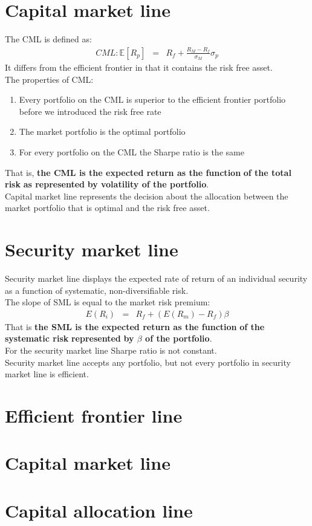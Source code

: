 \section{Capital market line}
The CML is defined as:
\begin{eqnarray}
	CML: \mathbb{E}[R_{p}] &=& R_{f} + \frac{R_{M} - R_{f}}{\sigma_{M}}\sigma_{p}
\end{eqnarray}
It differs from the efficient frontier in that it contains the risk free asset.\\
The properties of CML:
\begin{enumerate}
	\item Every portfolio on the CML is superior to the efficient frontier portfolio before we introduced the risk free rate
	\item The market portfolio is the optimal portfolio
	\item For every portfolio on the CML the Sharpe ratio is the same
\end{enumerate}
That is, \textbf{\color{blue}the CML is the expected return as the function} \textbf{\color{red}of the total risk} \textbf{\color{blue}as represented} \textbf{\color{red}by volatility of the portfolio}.\\
Capital market line represents the decision about the allocation between the market portfolio that is optimal and the risk free asset.

\section{Security market line}
Security market line displays the expected rate of return of an individual security as a function of systematic, non-diversifiable risk.\\
The slope of SML is equal to the market risk premium:
\begin{eqnarray}
E(R_{i}) &=& R_{f} + (E(R_{m}) - R_{f})\beta
\end{eqnarray}
That is \textbf{\color{blue}the SML is the expected return as the function} \textbf{\color{red}of the systematic risk} \textbf{\color{blue}represented} \textbf{\color{red}by $\beta$ of the portfolio}.\\
For the security market line Sharpe ratio is not constant.\\
Security market line accepts any portfolio, but not every portfolio in security market line is efficient.

\section{Efficient frontier line}

\section{Capital market line}

\section{Capital allocation line}

